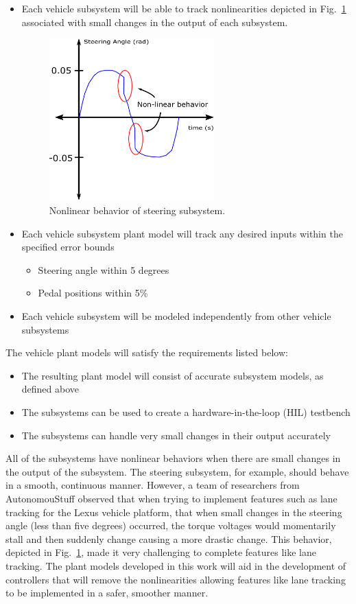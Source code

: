 \documentclass[conference]{IEEEtran}
\begin{document}
\begin{itemize}
\item Each vehicle subsystem will be able to track nonlinearities depicted in Fig.~\ref{fig:nonlinGraph} associated with small changes in the output of each subsystem. %
  \begin{figure}[htbp]
    \centering
    \captionsetup{justification=centering}
    \includegraphics[width=2.5in]{figs/inkscape/nonlinearBehavior}
    \caption{Nonlinear behavior of steering subsystem.}
    \label{fig:nonlinGraph}
  \end{figure}

\item Each vehicle subsystem plant model will track any desired inputs within the specified error bounds\add{:}
	\begin{itemize}
		\item Steering angle within 5 degrees
		\item Pedal positions within 5\%
	\end{itemize}
\item Each vehicle subsystem will be modeled independently from other vehicle subsystems
\end{itemize}
%
The vehicle plant models will satisfy the requirements listed below:
\begin{itemize}
    \item The resulting plant model will consist of accurate subsystem models, as defined above
    \item The subsystems can be used to create a hardware-in-the-loop (HIL) testbench
    \item The subsystems can handle very small changes in their output accurately
\end{itemize}
%

All of the subsystems have nonlinear behaviors when there are small changes in the output of the subsystem. The steering subsystem, for example, should behave in a smooth, continuous manner. However, a team of researchers from AutonomouStuff observed that when trying to implement features such as lane tracking for the Lexus vehicle platform, that when small changes in the steering angle (less than five degrees) occurred, the torque voltages would momentarily stall and then suddenly change causing a more drastic change. This behavior, depicted in Fig.~\ref{fig:nonlinGraph}, made it very challenging to complete features like lane tracking. The plant models developed in this work will aid in the development of controllers that will remove the nonlinearities allowing features like lane tracking to be implemented in a safer, smoother manner.
\end{document}
